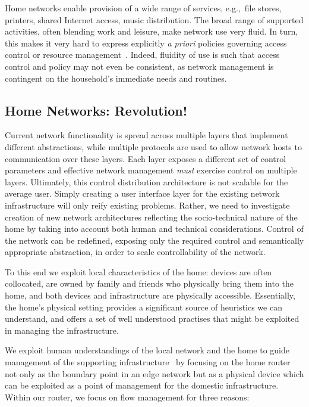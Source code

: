 Home networks enable provision of a wide range of services, e.g.,~file stores,
printers, shared Internet access, music distribution.  The broad range of
supported activities, often blending work and leisure, make network use very
fluid.  In turn, this makes it very hard to express explicitly \emph{a priori}
policies governing access control or resource management~.
Indeed, fluidity of use is such that access control and policy may not even be
consistent, as network management is contingent on the household's immediate
needs and routines.

\subsection{Home Networks: Revolution!} \label{s:revolution}

Current network functionality is spread across multiple layers that implement
different abstractions, while multiple protocols are used to allow network hosts
to communication over these layers. Each layer exposes a different set of
control parameters and effective network management \emph{must} exercise control
on multiple layers. Ultimately, this control distribution architecture is not
scalable for the average user. Simply creating a user interface layer for the
existing network infrastructure will only reify existing problems.  Rather, we
need to investigate creation of new network architectures reflecting the
socio-technical nature of the home by taking into account both human and
technical considerations. Control of the network can be redefined, exposing only
the required control and semantically appropriate abstraction, in order to scale
controllability of the network.

To this end we exploit local characteristics of the home: devices are often
collocated, are owned by family and friends who physically bring them into the
home, and both devices and infrastructure are physically accessible.
Essentially, the home's physical setting provides a significant source of
heuristics we can understand, and offers a set of well understood practises that
might be exploited in managing the infrastructure.  

We exploit human understandings of the local network and the home to guide
management of the supporting infrastructure~ by focusing on
the home router not only as the boundary point in an edge network but as a
physical device which can be exploited as a point of management for the domestic
infrastructure.  Within our router, we focus on flow management for three
reasons: 

